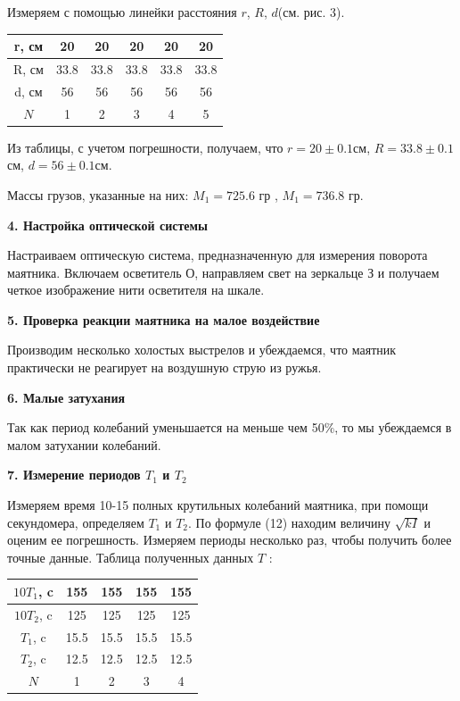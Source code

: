\documentclass[a4paper,12pt]{article} %
\begin{document}
Измеряем с помощью линейки расстояния $r$, $R$, $d$(см. рис. 3).

\begin{center}
\begin{tabular}{|c|c|c|c|c|c|}
\hline 
r, см  & 20 & 20 & 20 & 20 & 20\\ 
\hline
R, см  & 33.8 & 33.8 & 33.8 & 33.8 & 33.8\\ 
\hline
d, см  & 56 & 56 & 56 & 56 & 56\\ 
\hline 
$N$  & 1 & 2 & 3 & 4 & 5\\ 
\hline
\end{tabular} 
\end{center}

Из таблицы, с учетом погрешности, получаем, что $r = 20 \pm 0.1$см, $R = 33.8 \pm 0.1$см, $d = 56 \pm 0.1$см.

Массы грузов, указанные на них: $M_1 = 725.6 $ гр , $M_1 = 736.8$ гр.
\begin{center}
{\bf 4. Настройка оптической системы}
\end{center}

Настраиваем оптическую система, предназначенную для измерения поворота маятника. Включаем осветитель О, направляем свет на зеркальце З и получаем четкое изображение нити осветителя на шкале.
\begin{center}
{\bf 5. Проверка реакции маятника на малое воздействие}
\end{center}

Производим несколько холостых выстрелов и убеждаемся, что маятник практически не реагирует на воздушную струю из ружья.
\begin{center}
{\bf 6. Малые затухания}
\end{center}

Так как период колебаний уменьшается на меньше чем 50$\%$, то мы убеждаемся в малом затухании колебаний.
\begin{center}
{\bf 7. Измерение периодов $T_1$ и $T_2$}
\end{center}

Измеряем время 10-15 полных крутильных колебаний маятника, при помощи секундомера, определяем $T_1$ и $T_2$. По формуле (12) находим величину $\sqrt{kI}$ и оценим ее погрешность. Измеряем периоды несколько раз, чтобы получить более точные данные. Таблица полученных данных $T$ :

\begin{center}
\begin{tabular}{|c|c|c|c|c|}
\hline 
$10T_1$, c& 155 & 155 & 155 & 155 \\ 
\hline 
$10T_2$, c& 125 & 125 & 125 & 125 \\ 
\hline 
$T_1$, c& 15.5 & 15.5 & 15.5 & 15.5 \\ 
\hline 
$T_2$, c& 12.5 & 12.5 & 12.5 & 12.5 \\ 
\hline 
$N$ & 1 & 2 & 3 & 4 \\ 
\hline 
\end{tabular} 
\end{center}
\end{document}
